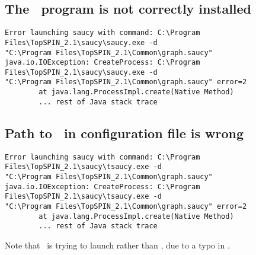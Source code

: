 
\subsection{The \saucy\ program is not correctly installed}


\exampleerrormessage

\begin{lstlisting}
Error launching saucy with command: C:\Program Files\TopSPIN_2.1\saucy\saucy.exe -d
"C:\Program Files\TopSPIN_2.1\Common\graph.saucy"
java.io.IOException: CreateProcess: C:\Program Files\TopSPIN_2.1\saucy\saucy.exe -d
"C:\Program Files\TopSPIN_2.1\Common\graph.saucy" error=2
        at java.lang.ProcessImpl.create(Native Method)
        ... rest of Java stack trace
\end{lstlisting}



\subsection{Path to \saucy\ in configuration file is wrong}


\exampleerrormessage

\begin{lstlisting}
Error launching saucy with command: C:\Program Files\TopSPIN_2.1\saucy\tsaucy.exe -d
"C:\Program Files\TopSPIN_2.1\Common\graph.saucy"
java.io.IOException: CreateProcess: C:\Program Files\TopSPIN_2.1\saucy\tsaucy.exe -d
"C:\Program Files\TopSPIN_2.1\Common\graph.saucy" error=2
        at java.lang.ProcessImpl.create(Native Method)
        ... rest of Java stack trace
\end{lstlisting}
%
Note that \topspin\ is trying to launch  rather
than \inline{saucy.exe}, due to a typo in \inline{config.txt}.

